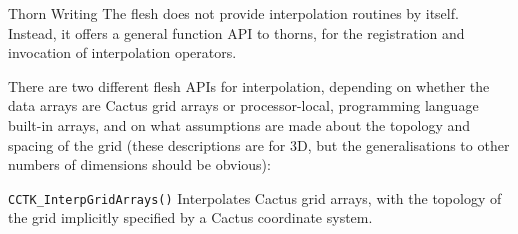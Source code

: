 \begin{cactuspart}{Thorn Writing}
The flesh does not provide interpolation routines by itself. Instead,
it offers a general function API to thorns, for the registration and
invocation of interpolation operators.

There are two different flesh APIs for interpolation, depending
on whether the data arrays are Cactus grid arrays or processor-local,
programming language built-in arrays, and on what assumptions
are made about the topology and spacing of the grid (these descriptions
are for 3D, but the generalisations to other numbers of dimensions
should be obvious):
\begin{Lentry}
\item[\texttt{CCTK\_InterpGridArrays()}]
        Interpolates Cactus grid arrays, with the topology of the
        grid implicitly specified by a Cactus coordinate system.


\end{Lentry}
\end{cactuspart}
